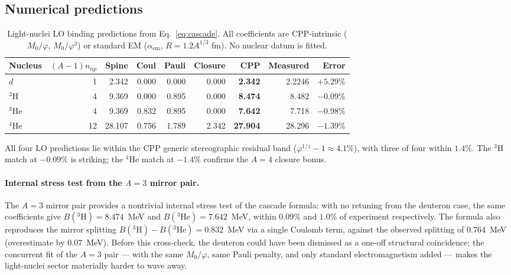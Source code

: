 \documentclass[11pt,letterpaper]{article}
\newcommand{\phig}{\varphi}
\newcommand{\Mzero}{M_0}
\newcommand{\npnp}{n_{np}}
\begin{document}
\subsection{Numerical predictions}

\begin{table}[H]
\centering
\caption{Light-nuclei LO binding predictions from Eq.~\ref{eq:cascade}. All coefficients are CPP-intrinsic ($\Mzero/\phig$, $\Mzero/\phig^3$) or standard EM ($\alpha_{\mathrm{em}}$, $R = 1.2 A^{1/3}$ fm). No nuclear datum is fitted.}
\label{tab:predictions}
\begin{tabular}{@{}lrrrrrrrr@{}}
\toprule
Nucleus & $(A{-}1)\npnp$ & Spine & Coul & Pauli & Closure & CPP & Measured & Error \\
\midrule
$d$           & 1  & 2.342  & 0.000 & 0.000 & 0.000 & \textbf{2.342}  & 2.2246 & $+5.29\%$ \\
${}^3$H       & 4  & 9.369  & 0.000 & 0.895 & 0.000 & \textbf{8.474}  & 8.482  & $-0.09\%$ \\
${}^3$He      & 4  & 9.369  & 0.832 & 0.895 & 0.000 & \textbf{7.642}  & 7.718  & $-0.98\%$ \\
${}^4$He      & 12 & 28.107 & 0.756 & 1.789 & 2.342 & \textbf{27.904} & 28.296 & $-1.39\%$ \\
\bottomrule
\end{tabular}
\end{table}

All four LO predictions lie within the CPP generic stereographic residual band ($\phig^{1/z} - 1 \approx 4.1\%$), with three of four within $1.4\%$. The ${}^3$H match at $-0.09\%$ is striking; the ${}^4$He match at $-1.4\%$ confirms the $A = 4$ closure bonus.

\paragraph{Internal stress test from the $A=3$ mirror pair.} The $A=3$ mirror pair provides a nontrivial internal stress test of the cascade formula: with no retuning from the deuteron case, the same coefficients give $B({}^3\mathrm{H}) = 8.474$~MeV and $B({}^3\mathrm{He}) = 7.642$~MeV, within $0.09\%$ and $1.0\%$ of experiment respectively. The formula also reproduces the mirror splitting $B({}^3\mathrm{H}) - B({}^3\mathrm{He}) = 0.832$~MeV via a single Coulomb term, against the observed splitting of $0.764$~MeV (overestimate by $0.07$~MeV). Before this cross-check, the deuteron could have been dismissed as a one-off structural coincidence; the concurrent fit of the $A=3$ pair --- with the same $\Mzero/\phig$, same Pauli penalty, and only standard electromagnetism added --- makes the light-nuclei sector materially harder to wave away.
\end{document}
